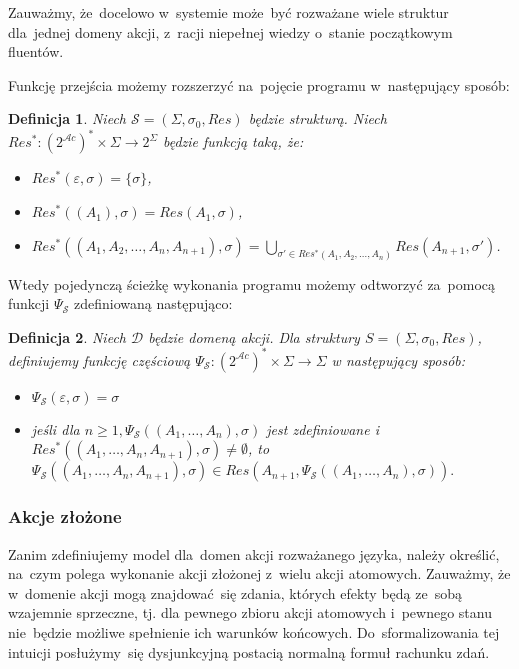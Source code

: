 \documentclass[11pt,a4paper]{article}
\newtheorem{defn}{Definicja}
\begin{document}
Zauważmy, że~docelowo w~systemie może~być rozważane wiele struktur dla~jednej domeny akcji, z~racji niepełnej wiedzy o~stanie początkowym fluentów.

Funkcję przejścia możemy rozszerzyć na~pojęcie programu w~następujący sposób:

\begin{defn}
    Niech $\mathcal{S} = (\Sigma, \sigma_0, Res)$ będzie strukturą.
    Niech $Res^* : (2^{\mathcal{A}c})^* \times \Sigma \to 2^\Sigma$ będzie funkcją taką, że:
    \begin{itemize}
        \item $Res^*(\varepsilon, \sigma) = \{ \sigma \}$,
        \item $Res^*((A_1), \sigma) = Res(A_1, \sigma)$,
        \item $Res^*((A_1,A_2,\dots,A_n,A_{n+1}), \sigma) = \bigcup_{\sigma' \in Res^*(A_1,A_2,\dots,A_n)} Res(A_{n+1}, \sigma')$.
    \end{itemize}
\end{defn}

Wtedy pojedynczą ścieżkę wykonania programu możemy odtworzyć za~pomocą funkcji $\Psi_{\mathcal{S}}$ zdefiniowaną następująco:

\begin{defn}
    Niech $\mathcal{D}$ będzie domeną akcji. Dla struktury $S = (\Sigma,\sigma_0,Res)$, definiujemy funkcję częściową 
    $\Psi_{\mathcal{S}} : (2^{\mathcal{A}c})^* \times \Sigma \rightarrow \Sigma$ w następujący sposób:
    \begin{itemize}
    \item $\Psi_{\mathcal{S}}(\varepsilon,\sigma) = \sigma$
    \item jeśli dla $n \geq 1, \Psi_{\mathcal{S}}((A_1,\dots,A_n),\sigma)$ jest zdefiniowane i $Res^*((A_1,\dots,A_n,A_{n+1}),\sigma) \neq \emptyset$, to~$\Psi_{\mathcal{S}}((A_1,\dots,A_n,A_{n+1}),\sigma) \in Res(A_{n+1},\Psi_{\mathcal{S}}((A_1,\dots,A_n),\sigma)).$
    \end{itemize}
\end{defn}

\subsubsection{Akcje złożone}

Zanim zdefiniujemy model dla~domen akcji rozważanego języka, należy określić, na~czym polega wykonanie akcji złożonej z~wielu akcji atomowych.
Zauważmy, że w~domenie akcji mogą znajdować~się zdania, których efekty będą ze~sobą wzajemnie sprzeczne, tj. dla pewnego zbioru akcji atomowych i~pewnego stanu nie~będzie możliwe spełnienie ich warunków końcowych.
Do~sformalizowania tej intuicji posłużymy~się dysjunkcyjną postacią normalną formuł rachunku zdań.
\end{document}
